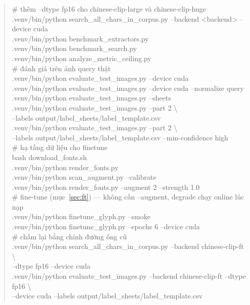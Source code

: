 \documentclass[11pt,a4paper]{article}
\begin{document}
\begin{quote}\small\ttfamily
\# thêm --dtype fp16 cho chinese-clip-large và chinese-clip-huge\\
.venv/bin/python search\_all\_chars\_in\_corpus.py --backend <backend> --device cuda\\
.venv/bin/python benchmark\_extractors.py\\
.venv/bin/python benchmark\_search.py\\
.venv/bin/python analyze\_metric\_ceiling.py\\[4pt]
\# đánh giá trên ảnh query thật\\
.venv/bin/python evaluate\_test\_images.py --device cuda\\
.venv/bin/python evaluate\_test\_images.py --device cuda --normalize query\\
.venv/bin/python evaluate\_test\_images.py --sheets\\
.venv/bin/python evaluate\_test\_images.py --part 2 \textbackslash\\
\hspace*{2em}--labels output/label\_sheets/label\_template.csv\\
.venv/bin/python evaluate\_test\_images.py --part 2 \textbackslash\\
\hspace*{2em}--labels output/label\_sheets/label\_template.csv --min-confidence high\\[4pt]
\# hạ tầng dữ liệu cho finetune\\
bash download\_fonts.sh\\
.venv/bin/python render\_fonts.py\\
.venv/bin/python scan\_augment.py --calibrate\\
.venv/bin/python render\_fonts.py --augment 2 --strength 1.0\\[4pt]
\# fine-tune (mục~\ref{sec:ft}) --- không cần --augment, degrade chạy online lúc nạp\\
.venv/bin/python finetune\_glyph.py --smoke\\
.venv/bin/python finetune\_glyph.py --epochs 6 --device cuda\\[4pt]
\# chấm lại bằng chính đường ống cũ\\
.venv/bin/python search\_all\_chars\_in\_corpus.py --backend chinese-clip-ft \textbackslash\\
\hspace*{2em}--dtype fp16 --device cuda\\
.venv/bin/python evaluate\_test\_images.py --backend chinese-clip-ft --dtype fp16 \textbackslash\\
\hspace*{2em}--device cuda --labels output/label\_sheets/label\_template.csv
\end{quote}
\end{document}

